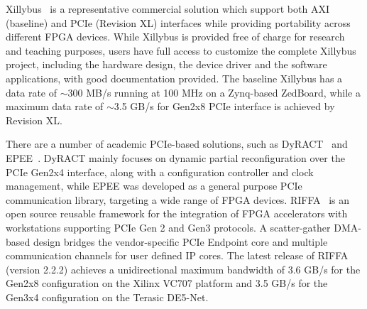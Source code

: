 Xillybus~\cite{xillybus2018} is a representative commercial solution which support both AXI (baseline) and PCIe (Revision XL) interfaces while providing portability across different FPGA devices. 
While Xillybus is provided free of charge for research and teaching purposes, users have full access to customize the complete Xillybus project, including the hardware design, the device driver and the software applications, with good documentation provided. 
The baseline Xillybus has a data rate of $\sim$300 MB/s running at 100 MHz on a Zynq-based ZedBoard, while a maximum data rate of $\sim$3.5 GB/s for Gen2x8 PCIe interface is achieved by Revision XL.

There are a number of academic PCIe-based solutions, such as DyRACT~\cite{vipin2014dyract} and EPEE~\cite{gong2014efficient}.
DyRACT mainly focuses on dynamic partial reconfiguration over the PCIe Gen2x4 interface, along with a configuration controller and clock management, while EPEE was developed as a general purpose PCIe communication library, targeting a wide range of FPGA devices. 
RIFFA~\cite{jacobsen2015riffa} is an open source reusable framework for the integration of FPGA accelerators with workstations supporting PCIe Gen 2 and Gen3 protocols. 
A scatter-gather DMA-based design bridges the vendor-specific PCIe Endpoint core and multiple communication channels for user defined IP cores. 
The latest release of RIFFA (version 2.2.2) achieves a unidirectional maximum bandwidth of 3.6 GB/s for the Gen2x8 configuration on the Xilinx VC707 platform and 3.5 GB/s for the Gen3x4 configuration on the Terasic DE5-Net.



